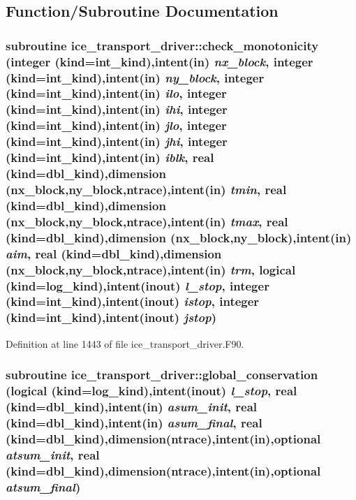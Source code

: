 \subsection{Function/Subroutine Documentation}
\hypertarget{namespaceice__transport__driver_a21179a91327fdb3bd51d2e7b5e3b170d}{
\subsubsection[{check\_\-monotonicity}]{\setlength{\rightskip}{0pt plus 5cm}subroutine ice\_\-transport\_\-driver::check\_\-monotonicity (integer (kind=int\_\-kind),intent(in) {\em nx\_\-block}, \/  integer (kind=int\_\-kind),intent(in) {\em ny\_\-block}, \/  integer (kind=int\_\-kind),intent(in) {\em ilo}, \/  integer (kind=int\_\-kind),intent(in) {\em ihi}, \/  integer (kind=int\_\-kind),intent(in) {\em jlo}, \/  integer (kind=int\_\-kind),intent(in) {\em jhi}, \/  integer (kind=int\_\-kind),intent(in) {\em iblk}, \/  real (kind=dbl\_\-kind),dimension (nx\_\-block,ny\_\-block,ntrace),intent(in) {\em tmin}, \/  real (kind=dbl\_\-kind),dimension (nx\_\-block,ny\_\-block,ntrace),intent(in) {\em tmax}, \/  real (kind=dbl\_\-kind),dimension (nx\_\-block,ny\_\-block),intent(in) {\em aim}, \/  real (kind=dbl\_\-kind),dimension (nx\_\-block,ny\_\-block,ntrace),intent(in) {\em trm}, \/  logical (kind=log\_\-kind),intent(inout) {\em l\_\-stop}, \/  integer (kind=int\_\-kind),intent(inout) {\em istop}, \/  integer (kind=int\_\-kind),intent(inout) {\em jstop})}}
\label{namespaceice__transport__driver_a21179a91327fdb3bd51d2e7b5e3b170d}


Definition at line 1443 of file ice\_\-transport\_\-driver.F90.\hypertarget{namespaceice__transport__driver_aa19bcb5dc77f4adee16ba36fc1f9e3b5}{
\subsubsection[{global\_\-conservation}]{\setlength{\rightskip}{0pt plus 5cm}subroutine ice\_\-transport\_\-driver::global\_\-conservation (logical (kind=log\_\-kind),intent(inout) {\em l\_\-stop}, \/  real (kind=dbl\_\-kind),intent(in) {\em asum\_\-init}, \/  real (kind=dbl\_\-kind),intent(in) {\em asum\_\-final}, \/  real (kind=dbl\_\-kind),dimension(ntrace),intent(in),optional {\em atsum\_\-init}, \/  real (kind=dbl\_\-kind),dimension(ntrace),intent(in),optional {\em atsum\_\-final})}}
\label{namespaceice__transport__driver_aa19bcb5dc77f4adee16ba36fc1f9e3b5}


